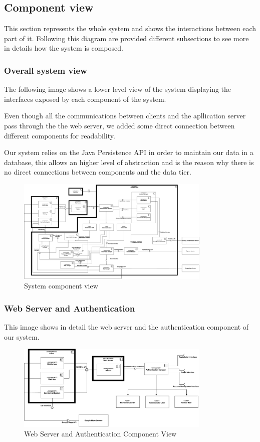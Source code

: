 \subsection{Component view}

This section represents the whole system and shows the interactions between each
part of it. Following this diagram are provided different subsections to see
more in details how the system is composed.

\subsubsection{Overall system view}

The following image shows a lower level view of the system displaying the
interfaces exposed by each component of the system.

Even though all the communications between clients and the apllication server
pass through the the web server, we added some direct connection between
different components for readability.

Our system relies on the Java Persistence API in order to maintain our data
in a database, this allows an higher level of abstraction and is the reason
why there is no direct connections between components and the data tier.

\begin{figure}[H]
	\includegraphics[width=350px]{../Datas/images/ComponentView.pdf}
	\caption{System component view}
	\label{fig:ComponentView}
\end{figure}

\subsubsection{Web Server and Authentication}

This image shows in detail the web server and the authentication component of
our system.

\begin{figure}[H]
	\includegraphics[width=350px]{../Datas/images/WebServerAndAuthenticationComponentView.pdf}
	\caption{Web Server and Authentication Component View}
	\label{fig:WebServerAndAuthenticationComponentView}
\end{figure}

